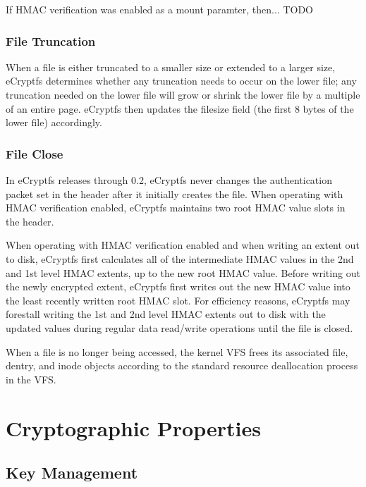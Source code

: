 \documentclass{article}
\begin{document}
If HMAC verification was enabled as a mount paramter, then... TODO

\subsubsection{File Truncation}

When a file is either truncated to a smaller size or extended to a
larger size, eCryptfs determines whether any truncation needs to occur
on the lower file; any truncation needed on the lower file will grow or
shrink the lower file by a multiple of an entire page. eCryptfs then
updates the filesize field (the first 8 bytes of the lower file) 
accordingly.

\subsubsection{File Close}

In eCryptfs releases through 0.2, eCryptfs never changes the
authentication packet set in the header after it initially creates the
file. When operating with HMAC verification enabled, eCryptfs
maintains two root HMAC value slots in the header.

When operating with HMAC verification enabled and when writing an
extent out to disk, eCryptfs first calculates all of the intermediate
HMAC values in the 2nd and 1st level HMAC extents, up to the new root
HMAC value. Before writing out the newly encrypted extent, eCryptfs
first writes out the new HMAC value into the least recently written
root HMAC slot. For efficiency reasons, eCryptfs may forestall writing
the 1st and 2nd level HMAC extents out to disk with the updated values
during regular data read/write operations until the file is closed.

When a file is no longer being accessed, the kernel VFS frees its
associated file, dentry, and inode objects according to the standard
resource deallocation process in the VFS.

\section{Cryptographic Properties}

\subsection{Key Management}

\label{key_management}
\end{document}
